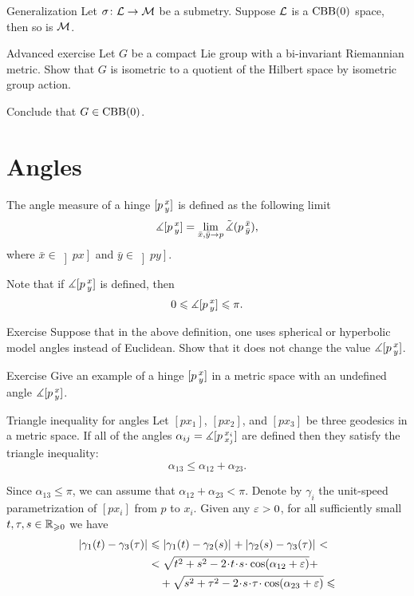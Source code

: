 \begin{thm}{Generalization}\label{thm:submetry-CBB}
Let $\sigma\colon\mathcal{L}\to\mathcal{M}$ be a submetry.
Suppose $\mathcal{L}$ is a $\mathrm{CBB}(0)$ space, then so is $\mathcal{M}$.
\end{thm}

\begin{thm}{Advanced exercise}
Let $G$ be a compact Lie group with a bi-invariant Riemannian metric.
Show that $G$ is isometric to a quotient of the Hilbert space by isometric group action.

Conclude that $G\in\mathrm{CBB}(0)$.
\end{thm}



\section{Angles}\label{sec:angles}


The angle measure of a hinge $[p\,{}^{x}_{y}]$ is defined as the following limit
\[\measuredangle[p\,{}^{x}_{y}]=\lim_{\bar x,\bar y\to p} \tilde\measuredangle(p\,{}^{\bar x}_{\bar y}),\]
where $\bar x\in\left]p x\right]$ and $\bar y\in\left]p y\right]$.

Note that if $\measuredangle[p\,{}^{x}_{y}]$ is defined, then
\[0\leqslant \measuredangle[p\,{}^{x}_{y}]\leqslant \pi.\]

\begin{thm}{Exercise}
Suppose that in the above definition, one uses spherical or hyperbolic model angles instead of Euclidean.
Show that it does not change the value $\measuredangle[p\,{}^{x}_{y}]$.
\end{thm}


\begin{thm}{Exercise}\label{ex:undefined-angle}
Give an example of a hinge $[p\,{}^{x}_{y}]$ in a metric space with an undefined angle $\measuredangle[p\,{}^{x}_{y}]$.
\end{thm}

\begin{thm}{Triangle inequality for angles}
\label{claim:angle-3angle-inq}
Let  $[px_1]$, $[px_2]$, and $[px_3]$ be three geodesics in a metric space.
If all of the angles $\alpha_{i j}=\measuredangle[p\,{}^{x_i}_{x_j}]$ are defined then they satisfy the triangle inequality:
\[\alpha_{13}\le \alpha_{12}+\alpha_{23}.\]

\end{thm}


Since $\alpha_{13}\le\pi$, we can assume that $\alpha_{12}+\alpha_{23}< \pi$.
Denote by $\gamma_i$ the unit-speed parametrization of $[px_i]$ from $p$ to $x_i$.
Given any $\varepsilon>0$, for all sufficiently small $t,\tau,s\in\mathbb{R}_{\geqslant0}$ we have
\begin{align*}
\dist{\gamma_1(t)}{\gamma_3(\tau)}{}
&\le 
\dist{\gamma_1(t)}{\gamma_2(s)}{}+\dist{\gamma_2(s)}{\gamma_3(\tau)}{}<\\
&<
\sqrt{t^2+s^2-2\cdot t\cdot  s\cdot \cos(\alpha_{12}+\eps)} +
\\
&\quad+\sqrt{s^2+\tau^2-2\cdot s\cdot \tau\cdot \cos(\alpha_{23}+\eps)}\le
\end{align*}

